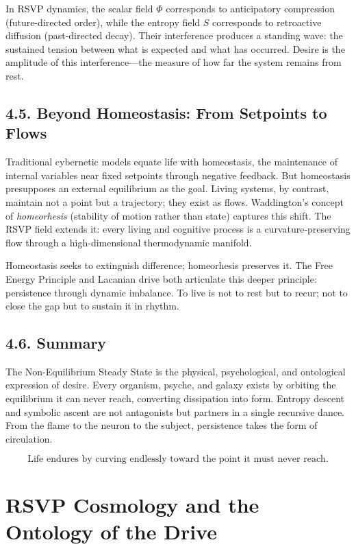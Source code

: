 \documentclass[12pt,a4paper]{article}
\begin{document}
In RSVP dynamics, the scalar field \(\Phi\) corresponds to anticipatory compression (future-directed order), while the entropy field \(S\) corresponds to retroactive diffusion (past-directed decay).  
Their interference produces a standing wave: the sustained tension between what is expected and what has occurred.  
Desire is the amplitude of this interference—the measure of how far the system remains from rest.

\subsection{4.5. Beyond Homeostasis: From Setpoints to Flows}

Traditional cybernetic models equate life with homeostasis, the maintenance of internal variables near fixed setpoints through negative feedback.  
But homeostasis presupposes an external equilibrium as the goal.  
Living systems, by contrast, maintain not a point but a trajectory; they exist as flows.  
Waddington’s concept of \emph{homeorhesis} (stability of motion rather than state) captures this shift.  
The RSVP field extends it: every living and cognitive process is a curvature-preserving flow through a high-dimensional thermodynamic manifold.

Homeostasis seeks to extinguish difference; homeorhesis preserves it.  
The Free Energy Principle and Lacanian drive both articulate this deeper principle: persistence through dynamic imbalance.  
To live is not to rest but to recur; not to close the gap but to sustain it in rhythm.

\subsection{4.6. Summary}

The Non-Equilibrium Steady State is the physical, psychological, and ontological expression of desire.  
Every organism, psyche, and galaxy exists by orbiting the equilibrium it can never reach, converting dissipation into form.  
Entropy descent and symbolic ascent are not antagonists but partners in a single recursive dance.  
From the flame to the neuron to the subject, persistence takes the form of circulation.

\[
\boxed{
\text{Life endures by curving endlessly toward the point it must never reach.}
}
\]


\section{RSVP Cosmology and the Ontology of the Drive}
\end{document}
